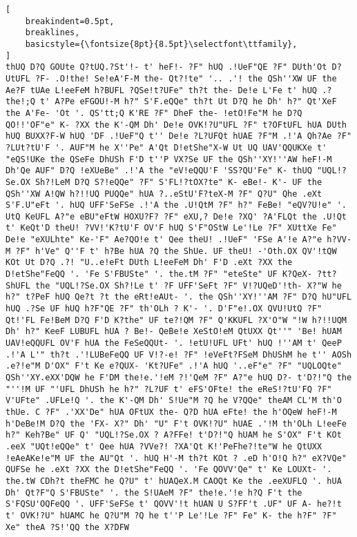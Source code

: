 \documentclass{uva-inf-bachelor-thesis}
\begin{document}
\begin{lstlisting}[
    breakindent=0.5pt,
    breaklines,
    basicstyle={\fontsize{8pt}{8.5pt}\selectfont\ttfamily},
]
thUQ D?Q GOUte Q?tUQ.?St'!- t' heF!- ?F" hUQ .!UeF"QE ?F" DUth'Ot D?UtUFL ?F- .O!the! Se!eA'F-M the- Qt?!te" '.. .'! the QSh''XW UF the Ae?F tUAe L!eeFeM h?BUFL ?QSe!t?UFe" th?t the- De!e L'Fe t' hUQ .?the!;Q t' A?Pe eFGOU!-M h?" S'F.eQQe" th?t Ut D?Q he Dh' h?" Qt'XeF the A'Fe- 'Ot '. QS'tt;Q K'RE ?F" DheF the- !etO!Fe"M he D?Q QO!!'OF"e" K- ?XX the K'-QM Dh' De!e OVK!?U"UFL ?F" t?OFtUFL hUA DUth hUQ BUXX?F-W hUQ 'DF .!UeF"Q t'' De!e ?L?UFQt hUAE ?F"M .!'A Qh?Ae ?F" ?LUt?tU'F '. AUF"M he X''Pe" A'Qt D!etShe"X-W Ut UQ UAV'QQUKXe t' "eQS!UKe the QSeFe DhUSh F'D t''P VX?Se UF the QSh''XY!''AW heF!-M Dh'Qe AUF" D?Q !eXUeBe" .!'A the "eV!eQQU'F 'SS?QU'Fe" K- thUQ "UQL!?Se.OX Sh?!LeM D?Q S?!eQQe" ?F" S'FL!?tOX?te" K- eBe!- K'- UF the QSh''XW A!QW h?!!UQ PUQQe" hUA ?..eStU'F?teX-M ?F" Q?U" Qhe .eXt S'F.U"eFt '. hUQ UFF'SeFSe .!'A the .U!QtM ?F" h?" FeBe! "eQV?U!e" '. UtQ KeUFL A?"e eBU"eFtW HOXU?F? ?F" eXU,? De!e ?XQ' ?A'FLQt the .U!Qt t' KeQt'D theU! ?VV!'K?tU'F OV'F hUQ S'F"OStW Le'!Le ?F" XUttXe Fe" De!e "eXULhte" Ke-'F" Ae?QO!e t' Qee theU! .!UeF" 'FSe A'!e A?"e h?VV-M ?F" h'Ve" Q''F t' h?Be hUA ?Q the ShUe. UF theU! -'Oth.OX QV'!tQW KOt Ut D?Q .?! "U..e!eFt DUth L!eeFeM Dh' F'D .eXt ?XX the D!etShe"FeQQ '. 'Fe S'FBUSte" '. the.tM ?F" "eteSte" UF K?QeX- ?tt?ShUFL the "UQL!?Se.OX Sh?!Le t' ?F UFF'SeFt ?F" V!?UQeD'!th- X?"W he h?" t?PeF hUQ Qe?t ?t the eRt!eAUt- '. the QSh''XY!''AM ?F" D?Q hU"UFL hUQ .?Se UF hUQ h?F"QE ?F" th'OLh ? K'- '. D'F"e!.OX QVU!UtQ ?F" Qt!'FL Fe!BeM D?Q F'D K?the" UF te?!QM ?F" Q'KKUFL ?X'O"W "!W h?!!UQM Dh' h?" KeeF LUBUFL hUA ? Be!- QeBe!e XeStO!eM QtUXX Qt''" 'Be! hUAM UAV!eQQUFL OV'F hUA the FeSeQQUt- '. !etU!UFL UFt' hUQ !''AM t' QeeP .!'A L'" th?t .'!LUBeFeQQ UF V!?-e! ?F" !eVeFt?FSeM DhUShM he t'' AOSh .e?!e"M D'OX" F't Ke e?QUX- 'Kt?UFe" .!'A hUQ '..eF"e" ?F" "UQLOQte" QSh''XY.eXX'DQW he F'DM the!e.'!eM ?!'QeM ?F" A?"e hUQ D?- t'D?!"Q the "''!M UF "'UFL DhUSh he h?" ?L?UF t' eFS'OFte! the eReS!?tU'FQ ?F" V'UFte" .UFLe!Q '. the K'-QM Dh' S!Ue"M ?Q he V?QQe" theAM CL'M th'O thUe. C ?F" .'XX'De" hUA OFtUX the- Q?D hUA eFte! the h'OQeW heF!-M h'DeBe!M D?Q the 'FX- X?" Dh' "U" F't OVK!?U" hUAE .'!M th'OLh L!eeFe h?" Keh?Be" UF Q' "UQL!?Se.OX ? A?FFe! t'D?!"Q hUAM he S'OX" F't KOt .eeX "UQt!eQQe" t' Qee hUA ?VVe?! ?XA'Qt K!'PeFhe?!te"W he QtUXX !eAeAKe!e"M UF the AU"Qt '. hUQ H'-M th?t KOt ? .eD h'O!Q h?" eX?VQe" QUFSe he .eXt ?XX the D!etShe"FeQQ '. 'Fe QOVV'Qe" t' Ke LOUXt- '. the.tW CDh?t theFMC he Q?U" t' hUAQeX.M CAOQt Ke the .eeXUFLQ '. hUA Dh' Qt?F"Q S'FBUSte" '. the S!UAeM ?F" the!e.'!e h?Q F't the S'FQSU'OQFeQQ '. UFF'SeFSe t' QOVV'!t hUAN U S?FF't .UF" UF A- he?!t t' OVK!?U" hUAMC he Q?U"M ?Q he t''P Le'!Le ?F" Fe" K- the h?F" ?F" Xe" theA ?S!'QQ the X?DFW
\end{lstlisting}
\clearpage
\end{document}
